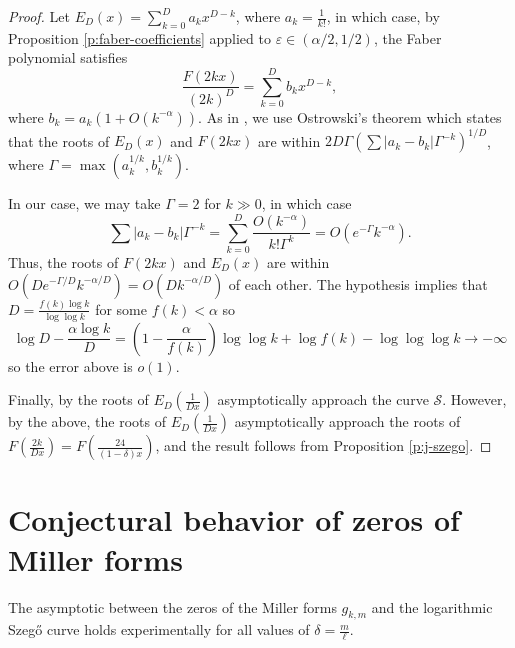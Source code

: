 \documentclass[12pt]{amsart}
\theoremstyle{plain} %
\theoremstyle{definition}
\theoremstyle{remark}
\numberwithin{equation}{section}
\begin{document}
\begin{proof}
Let $E_D(x)=\sum\limits_{k=0}^Da_kx^{D-k}$, where $a_k=\frac{1}{k!}$, in which
case, by Proposition \ref{p:faber-coefficients} applied to $\varepsilon\in (\alpha/2,1/2)$, the Faber polynomial satisfies
\[\frac{F(2kx)}{(2k)^D}=\sum_{k=0}^Db_kx^{D-k},\]
where $b_k=a_k(1+O(k^{-\alpha}))$.
As in \cite[\S 5.1]{rudnick:faber}, we use Ostrowski's theorem
which states that the roots of $E_D(x)$ and $F(2kx)$ are within
$2D \Gamma(\sum |a_k-b_k|\Gamma^{-k})^{1/D}$, where $\Gamma=\max
(a_k^{1/k},b_k^{1/k})$.

In our case, we may take $\Gamma=2$ for $k\gg 0$, in which case
\[\sum |a_k-b_k|\Gamma^{-k}=\sum_{k=0}^D \frac{O(k^{-\alpha})}{k! \Gamma^k}=O(e^{-\Gamma} k^{-\alpha}).\]
Thus, the roots of $F(2k x)$ and $E_D(x)$ are within $O(D
e^{-\Gamma/D}k^{-\alpha/D})=O(Dk^{-\alpha/D})$ of each
other. The hypothesis implies that $D=\frac{f(k)\log k}{\log\log k}$ for some $f(k)<\alpha$ so 
\[\log D-\frac{\alpha \log k}{D}=(1-\frac{\alpha}{f(k)})\log\log k +\log f(k)-\log\log\log k\to -\infty\]
so the error above is $o(1)$.

Finally, by \cite{szego} the roots of $E_D(\frac{1}{Dx})$ asymptotically approach the curve $\mathcal{S}$. However, by the above, the roots of $E_D(\frac{1}{Dx})$ asymptotically approach the roots of $F(\frac{2k}{D x})=F(\frac{24}{(1-\delta)x})$, and the result follows from Proposition \ref{p:j-szego}. 
\end{proof}


\section{Conjectural behavior of zeros of Miller forms} \label{Conject}
The asymptotic between the zeros of the Miller forms $g_{k,m}$
and the logarithmic Szeg\H{o} curve holds experimentally for all
values of $\delta=\frac{m}{\ell}$.
\end{document}
